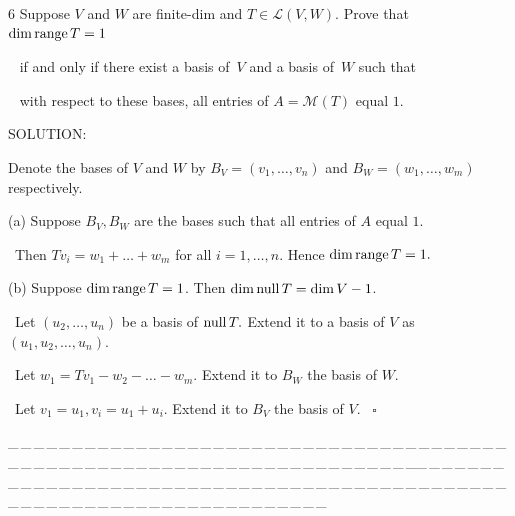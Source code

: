 \documentclass[a4paper, 11pt, UTF8]{article}
\def\range{\textup{range}\,}
\def\null{\textup{null\,}}
\def\Lm{\mathcal{L}}
\def\Mt{\mathcal{M}}
\begin{document}
\begin{large}
{\timesbf\Large 6} {\timessl\Large 
Suppose $V$ and $W$ are finite-dim and $T\in\Lm(V, W)$. Prove that $\dim\range T = 1$}\par\,\,\,
{\timessl\Large if and only if there exist a basis of \,$V$ and a basis of \,$W$ such that}\par\,\,\,
{\timessl\Large with respect to these bases, all entries of $A=\Mt(T)$ equal $1$.
}\par
{\timesbf S\footnotesize{OLUTION:}}\par\quad
Denote the bases of $V$ and $W$ by $B_V=(v_1,\dots,v_n)$ and $B_W=(w_1,\dots,w_m)$ respectively.\par\quad
(a) Suppose $B_V,B_W$ are the bases such that all entries of $A$ equal $1$.\par\qquad\,
Then $Tv_i=w_1+\dots+w_m$ for all $i=1,\dots,n$. Hence $\dim\range T=1.$\par\quad
(b) Suppose $\dim\range T=1$. Then $\dim\null T=\dim V-1$.\par\qquad\,
Let $(u_2,\dots,u_n)$ be a basis of $\null T.$ Extend it to a basis of $V$ as $(u_1,u_2,\dots,u_n)$.\par\qquad\,
Let $w_1=Tv_1-w_2-\dots-w_m.$ Extend it to $B_W$ the basis of $W$.\par\qquad\,
Let $v_1=u_1,v_i=u_1+u_i.$ Extend it to $B_V$ the basis of $V$.$\,\,\,\,\,\square$\par
{\tiny \_\,\_\,\_\,\_\,\_\,\_\,\_\,\_\,\_\,\_\,\_\,\_\,\_\,\_\,\_\,\_\,\_\,\_\,\_\,\_\,\_\,\_\,\_\,\_\,\_\,\_\,\_\,\_\,\_\,\_\,\_\,\_\,\_\,\_\,\_\,\_\,\_\,\_\,\_\,\_\,\_\,\_\,\_\,\_\,\_\,\_\,\_\,\_\,\_\,\_\,\_\,\_\,\_\,\_\,\_\,\_\,\_\,\_\,\_\,\_\,\_\,\_\,\_\,\_\,\_\,\_\,\_\,\_\,\_\,\_\,\_\_\,\_\,\_\,\_\,\_\,\_\,\_\,\_\,\_\,\_\,\_\,\_\,\_\,\_\,\_\,\_\,\_\,\_\,\_\,\_\,\_\,\_\,\_\,\_\,\_\,\_\,\_\,\_\,\_\,\_\,\_\,\_\,\_\,\_\,\_\,\_\,\_\,\_\,\_\,\_\,\_\,\_\,\_\,\_\,\_\,\_\,\_\,\_\,\_\,\_\,\_\,\_\,\_\,\_\,\_\,\_\,\_\,\_\,\_\,\_\,\_\,\_\,\_\,\_\,\_\,\_\,\_\,\_\,\_\,\_\,\_}{\tiny\,\par}


\end{large}
\end{document}
